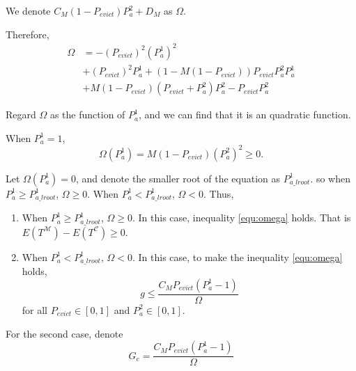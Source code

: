 We denote $C_{M}(1-P_{evict})P_{a}^{\mathfrak{2}}+D_{M}$ as $\Omega$.

Therefore,
\begin{equation}
\begin{split}
\Omega &=-(P_{evict})^2(P_{a}^{\mathfrak{1}})^2  \\
&+(P_{evict})^2P_{a}^{\mathfrak{1}}+(1-M(1-P_{evict}))P_{evict}P_{a}^{\mathfrak{2}}P_{a}^{\mathfrak{1}}\\
&+M(1-P_{evict})(P_{evict}+P_{a}^{\mathfrak{2}})P_{a}^{\mathfrak{2}}-P_{evict}P_{a}^{\mathfrak{2}}
\end{split}\end{equation}

Regard $\Omega$ as the function of $P_{a}^{\mathfrak{1}}$,
and we can find that it is an quadratic function.

When $P_{a}^{\mathfrak{1}} = 1$,
$$\Omega(P_{a}^{\mathfrak{1}})=M(1-P_{evict})(P_{a}^{\mathfrak{2}})^2 \geq 0 .$$

Let $\Omega(P_{a}^{\mathfrak{1}}) = 0$,
 and denote the smaller root of the equation as $P_{a\_lroot}^{\mathfrak{1}}$.
  so when $P_{a}^{\mathfrak{1}} \geq P_{a\_lroot}^{\mathfrak{1}}$, $\Omega \geq 0$.
   When $P_{a}^{\mathfrak{1}} < P_{a\_lroot}^{\mathfrak{1}}$, $\Omega < 0$.
 Thus,
\begin{enumerate}
  \item
  When $P_{a}^{\mathfrak{1}} \geq P_{a\_lroot}^{\mathfrak{1}}$, $\Omega \geq 0$.
  In this case, inequality \ref{equ:omega} holds. That is $E(T^{\mathcal{M}}) - E(T^{\mathcal{C}}) \geq 0$.
  \item
  When $P_{a}^{\mathfrak{1}} < P_{a\_lroot}^{\mathfrak{1}}$, $\Omega < 0$.
   In this case, to make the inequality \ref{equ:omega} holds,
   \begin{equation}\label{equ:ge}
     g \leq \frac{C_{M}P_{evict}(P_{a}^{\mathfrak{1}}-1)}{\Omega}
   \end{equation}
    for all $P_{evict} \in [0,1]$ and $P_{a}^{\mathfrak{2}} \in [0,1]$.
\end{enumerate}

For the second case, denote
    $$G_e = \frac{C_{M}P_{evict}(P_{a}^{\mathfrak{1}}-1)}{\Omega}$$


